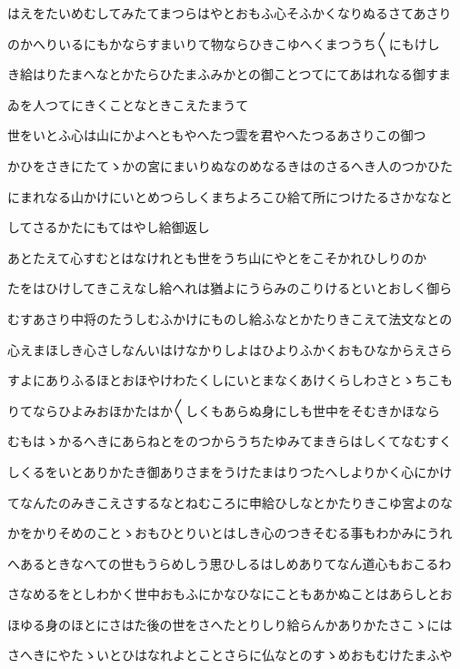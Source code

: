 \documentclass[a4paper,11pt,landscape]{ltjtarticle}
\begin{document}
はえをたいめむしてみたてまつらはやとおもふ心そふかくなりぬるさてあさり
\par\medskip
のかへりいるにもかならすまいりて物ならひきこゆへくまつうち〱にもけし
\par\medskip
き給はりたまへなとかたらひたまふみかとの御ことつてにてあはれなる御すま
\par\medskip
ゐを人つてにきくことなときこえたまうて
\par\medskip
世をいとふ心は山にかよへともやへたつ雲を君やへたつるあさりこの御つ
\par\medskip
かひをさきにたてゝかの宮にまいりぬなのめなるきはのさるへき人のつかひた
\par\medskip
にまれなる山かけにいとめつらしくまちよろこひ給て所につけたるさかななと
\par\medskip
してさるかたにもてはやし給御返し
\par\medskip
あとたえて心すむとはなけれとも世をうち山にやとをこそかれひしりのか
\par\medskip
たをはひけしてきこえなし給へれは猶よにうらみのこりけるといとおしく御ら
\par\medskip
むすあさり中将のたうしむふかけにものし給ふなとかたりきこえて法文なとの
\par\medskip
心えまほしき心さしなんいはけなかりしよはひよりふかくおもひなからえさら
\par\medskip
すよにありふるほとおほやけわたくしにいとまなくあけくらしわさとゝちこも
\par\medskip
りてならひよみおほかたはか〱しくもあらぬ身にしも世中をそむきかほなら
\par\medskip
むもはゝかるへきにあらねとをのつからうちたゆみてまきらはしくてなむすく
\par\medskip
しくるをいとありかたき御ありさまをうけたまはりつたへしよりかく心にかけ
\par\medskip
てなんたのみきこえさするなとねむころに申給ひしなとかたりきこゆ宮よのな
\par\medskip
かをかりそめのことゝおもひとりいとはしき心のつきそむる事もわかみにうれ
\par\medskip
へあるときなへての世もうらめしう思ひしるはしめありてなん道心もおこるわ
\par\medskip
さなめるをとしわかく世中おもふにかなひなにこともあかぬことはあらしとお
\par\medskip
ほゆる身のほとにさはた後の世をさへたとりしり給らんかありかたさこゝには
\par\medskip
さへきにやたゝいとひはなれよとことさらに仏なとのすゝめおもむけたまふや
\par\medskip
\end{document}

